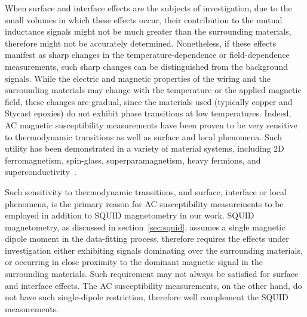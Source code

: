 When surface and interface effects are the subjects of investigation, due to the small volumes in which these effects occur, their contribution to the mutual inductance signals might not be much greater than the surrounding materials, therefore might not be accurately determined. Nonetheless, if these effects manifest as sharp changes in the temperature-dependence or field-dependence measurements, such sharp changes can be distinguished from the background signals. While the electric and magnetic properties of the wiring and the surrounding materials may change with the temperature or the applied magnetic field, these changes are gradual, since the materials used (typically copper and Stycast epoxies) do not exhibit phase transitions at low temperatures. Indeed, AC magnetic susceptibility measurements have been proven to be very sensitive to thermodynamic transitions as well as surface and local phenomena. Such utility has been demonstrated in a variety of material systems, including 2D ferromagnetism, spin-glass, superparamagnetism, heavy fermions, and superconductivity~\cite{ac_nitroxide, ac_spin_glass, ac_superpara, Ando1994, Gegenwart2005, Schemm2014}.

Such sensitivity to thermodynamic transitions, and surface, interface or local phenomena, is the primary reason for AC susceptibility measurements to be employed in addition to SQUID magnetometry in our work. SQUID magnetometry, as discussed in section~\ref{sec:squid}, assumes a single magnetic dipole moment in the data-fitting process, therefore requires the effects under investigation either exhibiting signals dominating over the surrounding materials, or occurring in close proximity to the dominant magnetic signal in the surrounding materials. Such requirement may not always be satisfied for surface and interface effects. The AC susceptibility measurements, on the other hand, do not have such single-dipole restriction, therefore well complement the SQUID measurements.